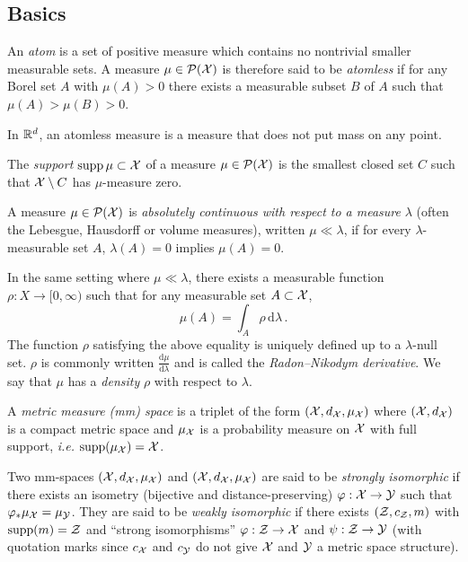     \subsection{Basics}
        \begin{defi}[Atom]\label{def:atom}
            An \emph{atom} is a set of positive measure which contains no nontrivial smaller measurable sets. A measure $\mu\in\mathcal{P}(\mathcal{X})$ is therefore said to be \emph{atomless} if for any Borel set $A$ with $\mu(A)>0$ there exists a measurable subset $B$ of $A$ such that $\mu (A)>\mu (B)>0$.
        \end{defi}
        \begin{example}
            In $\mathbb{R}^d$, an atomless measure is a measure that does not put mass on any point.
        \end{example}
        \begin{defi}[Support]\label{def:support}The \emph{support} $\operatorname{supp}\mu\subset \mathcal{X}$ of a measure $\mu\in\mathcal{P}(\mathcal{X})$ is the smallest closed set $C$ such that $\mathcal{X}\setminus C$ has $\mu$-measure zero.\end{defi}
        \begin{defi}\label{def:ac}
            A measure $\mu\in\mathcal{P}(\mathcal{X})$ is \emph{absolutely continuous with respect to a measure} $\lambda$ (often the Lebesgue, Hausdorff or volume measures), written $\mu\ll\lambda$, if for every $\lambda$-measurable set $A$, $\lambda(A) = 0$ implies $\mu (A)=0$.
        \end{defi}
        \begin{theorem}
            In the same setting where $\mu \ll \lambda$, there exists a measurable function $\rho:X\to [0,\infty )$ such that for any measurable set $A\subset \mathcal{X}$,
            $$\mu (A)=\int _{A}\rho\,\mathrm d\lambda\, .$$
            The function $\rho$ satisfying the above equality is uniquely defined up to a $\lambda$-null set. $\rho$ is commonly written $\frac {\mathrm d\mu }{\mathrm d\lambda }$ and is called the \emph{Radon--Nikodym derivative}. We say that $\mu$ has a \emph{density} $\rho$ with respect to $\lambda$.
        \end{theorem}
        \begin{defi}\label{def:mms}
            A \emph{metric measure (mm) space} is a triplet of the form $(\mathcal{X}, d_{\mathcal{X}} , \mu_{\mathcal{X}})$ where $(\mathcal{X}, d_{\mathcal{X}})$ is a compact metric space and $\mu_{\mathcal{X}}$ is a probability measure on $\mathcal{X}$ with full support, \textit{i.e.} $\operatorname{supp}(\mu_{\mathcal{X}})=\mathcal{X}$.

            Two mm-spaces $(\mathcal{X}, d_{\mathcal{X}} , \mu_{\mathcal{X}})$ and $(\mathcal{X}, d_{\mathcal{X}} , \mu_{\mathcal{X}})$ are said to be \emph{strongly isomorphic} if there exists an isometry (bijective and distance-preserving) $\varphi:\mathcal{X}\to\mathcal{Y}$ such that $\varphi_*\mu_{\mathcal{X}}=\mu_{\mathcal{Y}}$. They are said to be \emph{weakly isomorphic} if there exists $(\mathcal{Z},c_{\mathcal{Z}},m)$ with $\operatorname{supp}(m)=\mathcal{Z}$ and ``strong isomorphisms'' $\varphi:\mathcal{Z}\to\mathcal{X}$ and $\psi:\mathcal{Z}\to\mathcal{Y}$ (with quotation marks since $c_{\mathcal{X}}$ and $c_{\mathcal{Y}}$ do not give $\mathcal{X}$ and $\mathcal{Y}$ a metric space structure).
        \end{defi}
